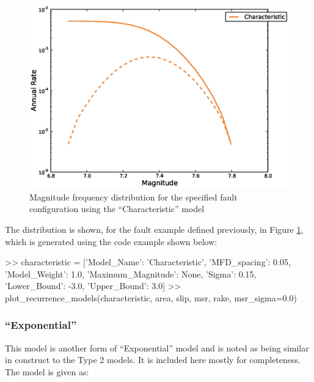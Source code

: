 \begin{figure}[htb]
  \centering
      \includegraphics[trim=5mm 5mm 5mm 5mm, clip, width=12cm]{./figures/characteristic_mfds.eps}
  \caption{Magnitude frequency distribution for the specified fault configuration using the ``Characteristic'' model}
  \label{fig:characteristic}
\end{figure}

The distribution is shown, for the fault example defined previously, in Figure \ref{fig:characteristic}, which is generated using the code example shown below:

\begin{python}[frame=single]
>> characteristic = [{'Model_Name': 'Characteristic',
                      'MFD_spacing': 0.05,
                      'Model_Weight': 1.0,
                      'Maximum_Magnitude': None,
                      'Sigma': 0.15, 
                      'Lower_Bound': -3.0, 
                      'Upper_Bound': 3.0}]
>> plot_recurrence_models(characteristic,
                          area,
                          slip,
                          msr,
                          rake,
                          msr_sigma=0.0)
\end{python}                               

\subsubsection{\textcite{YoungsCoppersmith1985} ``Exponential''}

This model is another form of ``Exponential'' model and is noted as being similar in construct to the \textcite{AndersonLuco1983} Type 2 models. It is included here mostly for completeness. The model is given as:

